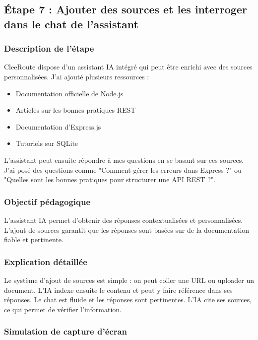 \documentclass[12pt,a4paper]{article}
\begin{document}
\subsection{Étape 7 : Ajouter des sources et les interroger dans le chat de l'assistant}

\subsubsection{Description de l'étape}

CleeRoute dispose d'un assistant IA intégré qui peut être enrichi avec des sources personnalisées. J'ai ajouté plusieurs ressources :
\begin{itemize}
    \item Documentation officielle de Node.js
    \item Articles sur les bonnes pratiques REST
    \item Documentation d'Express.js
    \item Tutoriels sur SQLite
\end{itemize}

L'assistant peut ensuite répondre à mes questions en se basant sur ces sources. J'ai posé des questions comme "Comment gérer les erreurs dans Express ?" ou "Quelles sont les bonnes pratiques pour structurer une API REST ?".

\subsubsection{Objectif pédagogique}

L'assistant IA permet d'obtenir des réponses contextualisées et personnalisées. L'ajout de sources garantit que les réponses sont basées sur de la documentation fiable et pertinente.

\subsubsection{Explication détaillée}

Le système d'ajout de sources est simple : on peut coller une URL ou uploader un document. L'IA indexe ensuite le contenu et peut y faire référence dans ses réponses. Le chat est fluide et les réponses sont pertinentes. L'IA cite ses sources, ce qui permet de vérifier l'information.

\subsubsection{Simulation de capture d'écran}
\end{document}
